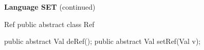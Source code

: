 \begin{minipage}[t]{\sw}
\slidenumber
\LARGE
{\bf Language SET} (continued)
\begin{qv}
Ref
public abstract class Ref {

    public abstract Val deRef();
    public abstract Val setRef(Val v);

}
\end{qv}
\end{minipage}
\clearpage
